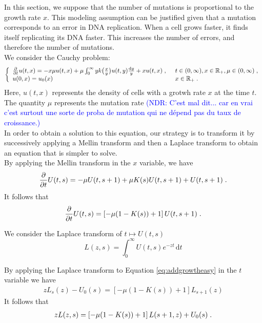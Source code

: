 \documentclass[11pt]{amsart}
\newcommand{\blue}[1]{\textcolor{blue}{#1}}
\newcommand{\diff}{\,\mathrm{d}}
\begin{document}
In this section, we suppose that the number of mutations is proportional to the growth rate $x$. This modeling assumption can be justified given that a mutation corresponds to an error in DNA replication. When a cell grows faster, it finds itself replicating its DNA faster. This increases the number of errors, and therefore the number of mutations.\\

We consider the Cauchy problem:
\begin{equation*}\left\{
    \begin{array}{ll}
	\frac{\partial}{\partial t}u(t,x) = - x\mu u(t,x) + \mu \int_{0}^{\infty} y k\big( \frac{x}{y}\big) u(t,y) \frac{\mathrm dy}{y} + xu(t,x)
	\; , \enspace
	& t \in (0, \infty), x \in \mathbb{R}_+, \mu \in (0, \infty) \; ,
	\\
	u(0, x) = u_0(x)
	& x \in \mathbb{R}_+
	\; .
    \end{array}
	\right.
\end{equation*}
Here, $u(t,x)$ represents the density of cells with a grotwh rate $x$ at the time $t$. The quantity $\mu$ represents the mutation rate \blue{(NDR: C'est mal dit... car en vrai c'est surtout une sorte de proba de mutation qui ne dépend pas du taux de croissance.)}\\

In order to obtain a solution to this equation, our strategy is to transform it by successively applying a Mellin transform and then a Laplace transform to obtain an equation that is simpler to solve. \\

By applying the Mellin transform in the $x$ variable, we have
	\begin{equation*}
		\frac{\partial}{\partial t} U(t,s) = - \mu U(t,s+1) + \mu K(s) U(t,s+1) + U(t,s+1)
		\; .
	\end{equation*}
It follows that
    \begin{equation}
        \frac{\partial}{\partial t} U(t,s) = \left[- \mu (1-K(s)) + 1\right] U(t,s+1)
		\; .
        \label{eq:addgrowtheasy}
    \end{equation}

We consider the Laplace transform of $t \mapsto U(t,s)$
$$ L(z,s) = \int_0^\infty U(t,s)e^{-zt}\diff t$$ 

By applying the Laplace transform to Equation \eqref{eq:addgrowtheasy} in the $t$ variable we have 
\begin{align*}
    zL_s(z) - U_0(s) = \left[- \mu (1-K(s)) + 1\right] L_{s+1}(z)
\end{align*}
It follows that 
\begin{align}
    \label{eq:wienerhopfeq}
    zL(z,s) = \left[- \mu (1-K(s)) + 1\right] L(s+1,z) + U_0(s)
    \; .
\end{align} 
\end{document}
